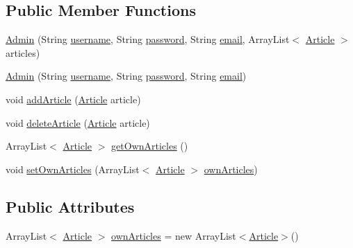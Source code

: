 \subsection*{Public Member Functions}
\begin{DoxyCompactItemize}
\item 
\hyperlink{classes_1_1deusto_1_1server_1_1jdo_1_1_admin_adf8cbc79ef2fe23545bde1a1dd635b08}{Admin} (String \hyperlink{classes_1_1deusto_1_1server_1_1jdo_1_1_user_aa1f05a7b487224d7c846fb81e5262c00}{username}, String \hyperlink{classes_1_1deusto_1_1server_1_1jdo_1_1_user_a9e3d470b8d2b36996759bd0595984870}{password}, String \hyperlink{classes_1_1deusto_1_1server_1_1jdo_1_1_user_a2aedb628a946e5044f27a3e6cbda31f0}{email}, Array\+List$<$ \hyperlink{classes_1_1deusto_1_1server_1_1jdo_1_1_article}{Article} $>$ articles)
\item 
\hyperlink{classes_1_1deusto_1_1server_1_1jdo_1_1_admin_ad1802d8f7e66466b71e3f8dd74a51af0}{Admin} (String \hyperlink{classes_1_1deusto_1_1server_1_1jdo_1_1_user_aa1f05a7b487224d7c846fb81e5262c00}{username}, String \hyperlink{classes_1_1deusto_1_1server_1_1jdo_1_1_user_a9e3d470b8d2b36996759bd0595984870}{password}, String \hyperlink{classes_1_1deusto_1_1server_1_1jdo_1_1_user_a2aedb628a946e5044f27a3e6cbda31f0}{email})
\item 
void \hyperlink{classes_1_1deusto_1_1server_1_1jdo_1_1_admin_a24c169163bc35735f4f02b9e4dc2514d}{add\+Article} (\hyperlink{classes_1_1deusto_1_1server_1_1jdo_1_1_article}{Article} article)
\item 
void \hyperlink{classes_1_1deusto_1_1server_1_1jdo_1_1_admin_a059fd0608e09ed77ed52bf31b54734e0}{delete\+Article} (\hyperlink{classes_1_1deusto_1_1server_1_1jdo_1_1_article}{Article} article)
\item 
Array\+List$<$ \hyperlink{classes_1_1deusto_1_1server_1_1jdo_1_1_article}{Article} $>$ \hyperlink{classes_1_1deusto_1_1server_1_1jdo_1_1_admin_a26e6fdf7339157c66b276bc20fdeca3c}{get\+Own\+Articles} ()
\item 
void \hyperlink{classes_1_1deusto_1_1server_1_1jdo_1_1_admin_abb330a6e4c9e543fff03ab213055c2c4}{set\+Own\+Articles} (Array\+List$<$ \hyperlink{classes_1_1deusto_1_1server_1_1jdo_1_1_article}{Article} $>$ \hyperlink{classes_1_1deusto_1_1server_1_1jdo_1_1_admin_aff35b2a52374104224e98ba92fd7eac3}{own\+Articles})
\end{DoxyCompactItemize}
\subsection*{Public Attributes}
\begin{DoxyCompactItemize}
\item 
Array\+List$<$ \hyperlink{classes_1_1deusto_1_1server_1_1jdo_1_1_article}{Article} $>$ \hyperlink{classes_1_1deusto_1_1server_1_1jdo_1_1_admin_aff35b2a52374104224e98ba92fd7eac3}{own\+Articles} = new Array\+List$<$\hyperlink{classes_1_1deusto_1_1server_1_1jdo_1_1_article}{Article}$>$()
\end{DoxyCompactItemize}
